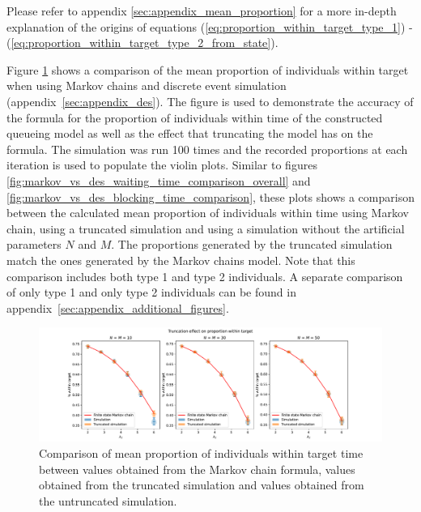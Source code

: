 Please refer to appendix \ref{sec:appendix_mean_proportion} for a more in-depth 
explanation of the origins of equations 
(\ref{eq:proportion_within_target_type_1}) - 
(\ref{eq:proportion_within_target_type_2_from_state}).

Figure \ref{fig:markov_vs_des_proportion_comparison_overall} shows a comparison
of the mean proportion of individuals within target when using Markov chains 
and discrete event simulation (appendix~\ref{sec:appendix_des}).
The figure is used to demonstrate the accuracy of the formula for the 
proportion of individuals within time of the constructed queueing model
as well as the effect that truncating the model has on the formula.
The simulation was run 100 times and the recorded proportions at each iteration 
is used to populate the violin plots.
Similar to figures \ref{fig:markov_vs_des_waiting_time_comparison_overall} and
\ref{fig:markov_vs_des_blocking_time_comparison}, these plots shows a comparison
between the calculated mean proportion of individuals within time using Markov 
chain, using a truncated simulation and using a simulation 
without the artificial parameters \(N\) and \(M\).
The proportions generated by the truncated simulation match the ones generated
by the Markov chains model.
Note that this comparison includes both type 1 and type 2 individuals.
A separate comparison of only type 1 and only type 2 individuals can be found 
in appendix~\ref{sec:appendix_additional_figures}.

\begin{figure}[H]
    \centering
    \includegraphics[width=\textwidth]{imgs/truncation_effect/proportion/main.pdf}
    \caption{
        Comparison of mean proportion of individuals within target time between 
        values obtained from the Markov chain formula, values obtained from the
        truncated simulation and values obtained from the untruncated
        simulation. 
    }
    \label{fig:markov_vs_des_proportion_comparison_overall}
\end{figure}

